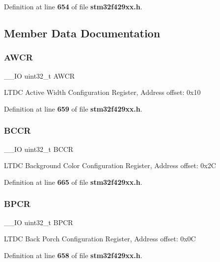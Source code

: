 Definition at line \textbf{ 654} of file \textbf{ stm32f429xx.\+h}.



\subsection{Member Data Documentation}
\mbox{\label{structLTDC__TypeDef_a2277d6936f88a3bbb0b7fd1481b2c2c5}} 
\subsubsection{A\+W\+CR}
{\footnotesize\ttfamily \+\_\+\+\_\+\+IO uint32\+\_\+t A\+W\+CR}

L\+T\+DC Active Width Configuration Register, Address offset\+: 0x10 

Definition at line \textbf{ 659} of file \textbf{ stm32f429xx.\+h}.

\mbox{\label{structLTDC__TypeDef_a7a7c554d0c2d78d8b044a699602e37e1}} 
\subsubsection{B\+C\+CR}
{\footnotesize\ttfamily \+\_\+\+\_\+\+IO uint32\+\_\+t B\+C\+CR}

L\+T\+DC Background Color Configuration Register, Address offset\+: 0x2C 

Definition at line \textbf{ 665} of file \textbf{ stm32f429xx.\+h}.

\mbox{\label{structLTDC__TypeDef_ab954c16d70935a24b62aad461a664878}} 
\subsubsection{B\+P\+CR}
{\footnotesize\ttfamily \+\_\+\+\_\+\+IO uint32\+\_\+t B\+P\+CR}

L\+T\+DC Back Porch Configuration Register, Address offset\+: 0x0C 

Definition at line \textbf{ 658} of file \textbf{ stm32f429xx.\+h}.

